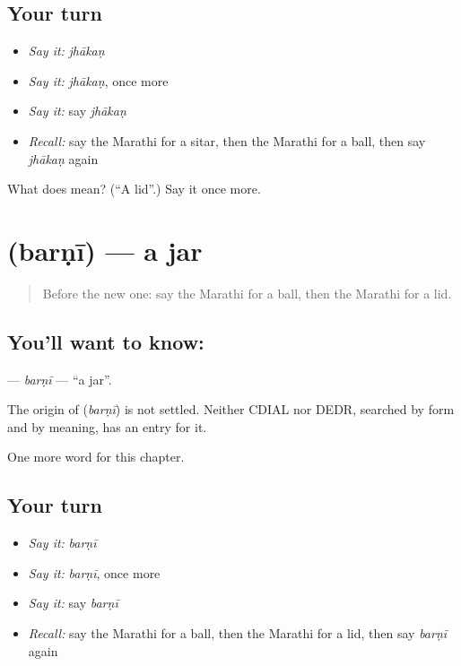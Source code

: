 \subsection*{Your turn}
\begin{itemize}
\raggedright
  \item \emph{Say it:} \emph{jhākaṇ}
  \item \emph{Say it:} \emph{jhākaṇ}, once more
  \item \emph{Say it:} say \emph{jhākaṇ}
  \item \emph{Recall:} say the Marathi for a sitar, then the Marathi for a ball, then say \emph{jhākaṇ} again
\end{itemize}

\begin{tcolorbox}[breakable,colback=teal!4,colframe=teal!35!black,title={Before you move on}]
What does  mean? (\textquotedblleft{}A lid\textquotedblright{}.) Say it once more.
\end{tcolorbox}
\section[\texorpdfstring{\mr{बरणी} (barṇī)}{बरणी (barṇī)}]{ (barṇī) — a jar}

\label{lesson:MR-C269-barni}



\begin{quote}
Before the new one: say the Marathi for a ball, then the Marathi for a lid.
\end{quote}

\subsection*{You'll want to know: }
\textbf{} — \emph{barṇī} — \textquotedblleft{}a jar\textquotedblright{}.

\begin{cousinweb}
The origin of \textbf{} (\emph{barṇī}) is not settled. Neither CDIAL nor DEDR, searched by form and by meaning, has an entry for it.
\end{cousinweb}

\begin{grammarlens}[title={What you've built}]
One more word for this chapter.
\end{grammarlens}

\subsection*{Your turn}
\begin{itemize}
\raggedright
  \item \emph{Say it:} \emph{barṇī}
  \item \emph{Say it:} \emph{barṇī}, once more
  \item \emph{Say it:} say \emph{barṇī}
  \item \emph{Recall:} say the Marathi for a ball, then the Marathi for a lid, then say \emph{barṇī} again
\end{itemize}

